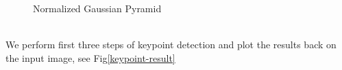 \documentclass[12pt]{article}
\newenvironment{QandA}
{
	\begin{enumerate}[label=\normalfont\arabic*.,leftmargin=2em,rightmargin=2em]\normalfont
	}
	{
	\end{enumerate}
}
\newenvironment{answered}{\setlength{\parindent}{1em}\par\normalfont}{}
\begin{document}
\begin{QandA}
\begin{answered}
\begin{figure}
  			\caption{Normalized Gaussian Pyramid}
  		\label{2nd-3rd-dog-norm}
\end{figure}
\\
We perform first three steps of keypoint detection and plot the results back on the input image, see Fig{\ref{keypoint-result}}
\begin{figure}
		\centering

\end{figure}
\end{answered}
\end{QandA}
\end{document}
